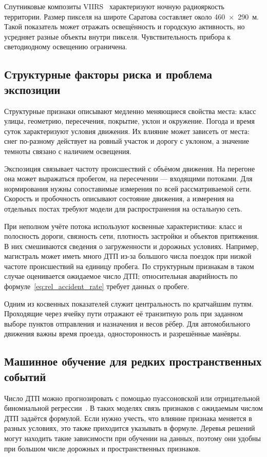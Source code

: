 \documentclass[coursework]{SCWorks}
\begin{document}
Спутниковые композиты VIIRS~\cite{viirs} характеризуют ночную
радиояркость территории. Размер пикселя на широте Саратова
составляет около 460~$\times$~290~м. Такой показатель может отражать
освещённость и городскую активность, но усредняет разные объекты
внутри пикселя. Чувствительность прибора к светодиодному
освещению ограничена.

\subsection{Структурные факторы риска и проблема экспозиции}

Структурные признаки описывают медленно меняющиеся свойства места:
класс улицы, геометрию, пересечения, покрытие, уклон и окружение.
Погода и время суток характеризуют условия движения. Их влияние
может зависеть от места: снег по-разному действует на ровный участок
и дорогу с уклоном, а значение темноты связано с наличием освещения.

Экспозиция связывает частоту происшествий с объёмом движения.
На перегоне она может выражаться пробегом, на пересечении ---
входящими потоками. Для нормирования нужны сопоставимые измерения
по всей рассматриваемой сети. Скорость и пробочность описывают
состояние движения, а измерения на отдельных постах требуют модели
для распространения на остальную сеть.

При неполном учёте потока используют косвенные характеристики:
класс и полосность дороги, связность сети, плотность застройки
и объектов притяжения. В них смешиваются сведения о загруженности
и дорожных условиях. Например, магистраль может иметь много ДТП
из-за большого числа поездок при низкой частоте происшествий
на единицу пробега. По структурным признакам в таком случае
оценивается ожидаемое число ДТП; относительная аварийность
по формуле~\eqref{eq:rel_accident_rate} требует данных о пробеге.

Одним из косвенных показателей служит центральность по кратчайшим
путям. Проходящие через ячейку пути отражают её транзитную роль
при заданном выборе пунктов отправления и назначения и весов
рёбер. Для автомобильного движения важны время проезда,
односторонность и разрешённые манёвры.

\subsection{Машинное обучение для редких пространственных событий}

Число ДТП можно прогнозировать с помощью пуассоновской или
отрицательной биномиальной регрессии~\cite{lord2010}. В таких моделях
связь признаков с ожидаемым числом ДТП задаётся формулой. Если нужно
учесть, что влияние признака меняется в разных условиях, это также
приходится указывать в формуле. Деревья решений могут находить такие
зависимости при обучении на данных, поэтому они удобны при большом
числе дорожных и пространственных признаков.
\end{document}
